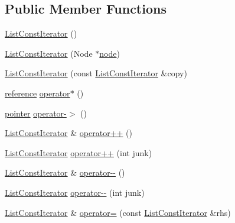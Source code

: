 \subsection*{Public Member Functions}
\begin{DoxyCompactItemize}
\item 
\hyperlink{structprism_1_1containers_1_1_list_const_iterator_afe621fa6aa058b8c2b371294bd198ae7}{List\+Const\+Iterator} ()
\item 
\hyperlink{structprism_1_1containers_1_1_list_const_iterator_a6400836e853410f83c958528827db7fe}{List\+Const\+Iterator} (Node $\ast$\hyperlink{structprism_1_1containers_1_1_list_const_iterator_ab430437e0a8fb4c69e208a2033c3ac3d}{node})
\item 
\hyperlink{structprism_1_1containers_1_1_list_const_iterator_a71db1768a039489c58ac0f91bf5bf5f8}{List\+Const\+Iterator} (const \hyperlink{structprism_1_1containers_1_1_list_const_iterator}{List\+Const\+Iterator} \&copy)
\item 
\hyperlink{structprism_1_1containers_1_1_list_const_iterator_a75f67a8dc204310a4ec2ad3104b85c3c}{reference} \hyperlink{structprism_1_1containers_1_1_list_const_iterator_a5fbda7e10bb6c4f5a80f426b5ae4ef4e}{operator$\ast$} ()
\item 
\hyperlink{structprism_1_1containers_1_1_list_const_iterator_a14b03b825ec014eaf85130739c0fa35d}{pointer} \hyperlink{structprism_1_1containers_1_1_list_const_iterator_aeac056d276b6f590d137f8ce2aa39f8f}{operator-\/$>$} ()
\item 
\hyperlink{structprism_1_1containers_1_1_list_const_iterator}{List\+Const\+Iterator} \& \hyperlink{structprism_1_1containers_1_1_list_const_iterator_a57031bea5249085ed1bac74851fd06a4}{operator++} ()
\item 
\hyperlink{structprism_1_1containers_1_1_list_const_iterator}{List\+Const\+Iterator} \hyperlink{structprism_1_1containers_1_1_list_const_iterator_a7504cf17004473b3528f9d05b392d92f}{operator++} (int junk)
\item 
\hyperlink{structprism_1_1containers_1_1_list_const_iterator}{List\+Const\+Iterator} \& \hyperlink{structprism_1_1containers_1_1_list_const_iterator_a7a7ef6172c73609c136052422e5d429e}{operator-\/-\/} ()
\item 
\hyperlink{structprism_1_1containers_1_1_list_const_iterator}{List\+Const\+Iterator} \hyperlink{structprism_1_1containers_1_1_list_const_iterator_a2e5472cbf810687ee566b1340c29dd64}{operator-\/-\/} (int junk)
\item 
\hyperlink{structprism_1_1containers_1_1_list_const_iterator}{List\+Const\+Iterator} \& \hyperlink{structprism_1_1containers_1_1_list_const_iterator_aa326252aa9e41c5dc8fef336b2efc3c7}{operator=} (const \hyperlink{structprism_1_1containers_1_1_list_const_iterator}{List\+Const\+Iterator} \&rhs)

\end{DoxyCompactItemize}
